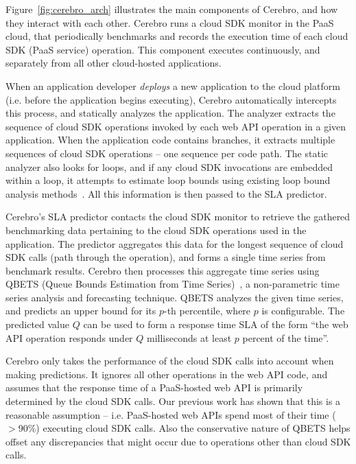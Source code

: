 Figure~\ref{fig:cerebro_arch} illustrates the main components of Cerebro, and how they interact with
each other. Cerebro runs a cloud SDK monitor in the PaaS cloud, that periodically benchmarks and records
the execution time of each cloud SDK (PaaS service) operation.
This component executes continuously, and separately from all other cloud-hosted applications.

When an application developer \textit{deploys} a new
application to the cloud platform (i.e. before the application begins
executing),
Cerebro automatically intercepts this process, and statically analyzes the 
application.  The analyzer extracts the sequence of cloud SDK operations invoked by each
web API operation in a given application. When the application code contains branches, it
extracts multiple sequences of cloud SDK operations -- one sequence per code path. The static
analyzer also looks for loops, and if any cloud SDK invocations are embedded within a loop, 
it attempts to estimate loop bounds using existing loop bound analysis methods~\cite{bygde2010static}.
All this information is then passed to the SLA predictor.  

Cerebro's SLA predictor contacts the cloud SDK monitor to retrieve the gathered benchmarking data
pertaining to the cloud SDK operations used in the application. The predictor aggregates
this data for the longest sequence of cloud SDK calls (path through the operation), and 
forms a single time series from benchmark results. 
Cerebro then processes this aggregate time series using QBETS (Queue
Bounds Estimation from Time Series)~\cite{Nurmi:2007:QQB:1791551.1791556}, a 
non-parametric time series analysis and forecasting technique. QBETS analyzes the given time 
series, and predicts an upper bound for its $p$-th percentile, where $p$ is configurable. The predicted
value $Q$ can be used to form a response time SLA of the form ``the web API operation responds 
under $Q$ milliseconds at least $p$ percent of the time''.

Cerebro only takes the performance of the cloud SDK calls into account
when making predictions. It ignores all other operations in the web API code, and
assumes that the response time of a PaaS-hosted web API is primarily determined
by the cloud SDK calls. Our previous work has shown that this is a reasonable
assumption -- i.e. PaaS-hosted web APIs spend most of their time ($> 90\%$) executing cloud 
SDK calls. Also the conservative nature of QBETS
helps offset any discrepancies that might occur due to operations other than cloud SDK calls.
 
